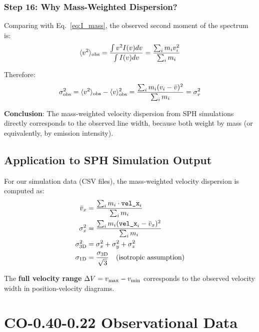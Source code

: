 \documentclass[twocolumn,amsmath,amssymb,prd,superscriptaddress,nofootinbib]{revtex4-2}
\begin{document}
\subsubsection{Step 16: Why Mass-Weighted Dispersion?}

Comparing with Eq.~\eqref{eq:I_mass}, the observed second moment of the spectrum is:
\begin{equation}
    \langle v^2 \rangle_{\rm obs} = \frac{\int v^2 I(v) dv}{\int I(v) dv} = \frac{\sum_i m_i v_i^2}{\sum_i m_i}
\end{equation}

Therefore:
\begin{equation}
    \sigma_{\rm obs}^2 = \langle v^2 \rangle_{\rm obs} - \langle v \rangle_{\rm obs}^2 = \frac{\sum_i m_i (v_i - \bar{v})^2}{\sum_i m_i} = \sigma_v^2
\end{equation}

\textbf{Conclusion}: The mass-weighted velocity dispersion from SPH simulations directly corresponds to the observed line width, because both weight by mass (or equivalently, by emission intensity).

\subsection{Application to SPH Simulation Output}

For our simulation data (CSV files), the mass-weighted velocity dispersion is computed as:
\begin{align}
    \bar{v}_x &= \frac{\sum_i m_i \cdot \texttt{vel\_x}_i}{\sum_i m_i} \\
    \sigma_x^2 &= \frac{\sum_i m_i (\texttt{vel\_x}_i - \bar{v}_x)^2}{\sum_i m_i} \\
    \sigma_{\rm 3D}^2 &= \sigma_x^2 + \sigma_y^2 + \sigma_z^2 \\
    \sigma_{\rm 1D} &= \frac{\sigma_{\rm 3D}}{\sqrt{3}} \quad \text{(isotropic assumption)}
\end{align}

The \textbf{full velocity range} $\Delta V = v_{\rm max} - v_{\rm min}$ corresponds to the observed velocity width in position-velocity diagrams.

\section{CO-0.40-0.22 Observational Data}
\label{app:oka_observations}
\end{document}
